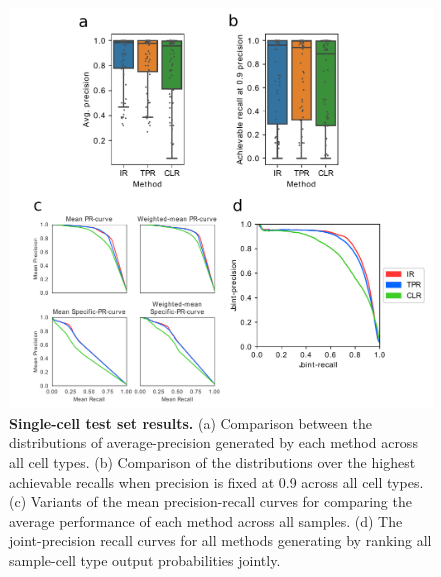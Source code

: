  \begin{figure}[h!]
       \centerline{\includegraphics[width=13cm]{figures/single_cell_test_results.pdf}}
       \caption{\textbf{Single-cell test set results.}  (a) Comparison between the distributions of average-precision generated by each method across all cell types.  (b) Comparison of the distributions over the highest achievable recalls when precision is fixed at 0.9 across all cell types. (c) Variants of the mean precision-recall curves for comparing the average performance of each method across all samples. (d) The joint-precision recall curves for all methods generating by ranking all sample-cell type output probabilities jointly.}
      \label{fig:results_test_single}
      \end{figure}

